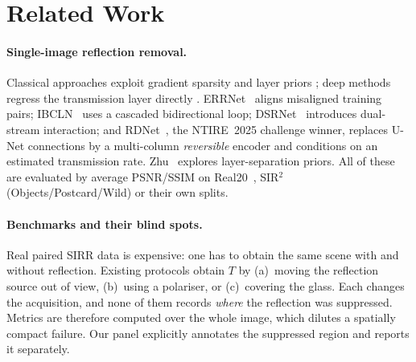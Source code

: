 \section{Related Work}
\label{sec:related}

\paragraph{Single-image reflection removal.}
Classical approaches exploit gradient sparsity and layer priors
\cite{levin04,li13,wan17}; deep methods regress the transmission layer directly
\cite{fan17,zhang18,wei19,hu20}. ERRNet~\cite{wei19} aligns misaligned training pairs; IBCLN~\cite{li20}
uses a cascaded bidirectional loop; DSRNet~\cite{dsrnet24} introduces dual-stream interaction; and
RDNet~\cite{rdnet25}, the NTIRE~2025 challenge winner, replaces U-Net connections by a multi-column
\emph{reversible} encoder and conditions on an estimated transmission rate. Zhu~\cite{zhu24}
explores layer-separation priors. All of these are evaluated by average PSNR/SSIM on
Real20~\cite{zhang18}, SIR$^2$~\cite{wan17} (Objects/Postcard/Wild) or their own splits.

\paragraph{Benchmarks and their blind spots.}
Real paired SIRR data is expensive: one has to obtain the same scene with and without reflection.
Existing protocols obtain $T$ by (a)~moving the reflection source out of view, (b)~using a
polariser, or (c)~covering the glass. Each changes the acquisition, and none of them records
\emph{where} the reflection was suppressed. Metrics are therefore computed over the whole image,
which dilutes a spatially compact failure. Our panel explicitly annotates the suppressed region and
reports it separately.

